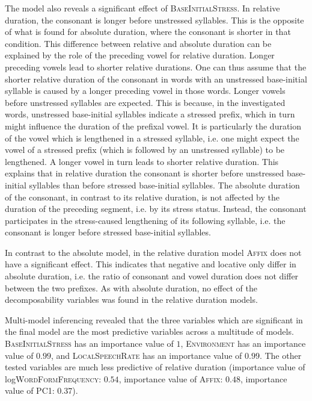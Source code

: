 The model also reveals a significant effect of \textsc{BaseInitialStress}. In relative duration, the consonant is longer before unstressed syllables. This is the opposite of what is found for absolute duration, where the consonant is shorter in that condition. 
This difference between relative and absolute duration can be explained by the role of the preceding vowel for relative duration. Longer preceding vowels lead to shorter relative durations. One can thus assume that the shorter relative duration of the consonant in words with an unstressed base-initial syllable is caused by a longer preceding vowel in those words.
Longer vowels before unstressed syllables are expected. This is because, in the investigated words, unstressed base-initial syllables indicate a stressed prefix, which in turn might influence the duration of the prefixal vowel. It is particularly the duration of the vowel which is lengthened in a stressed syllable, i.e. one might expect the vowel of a stressed prefix (which is followed by an unstressed syllable) to be lengthened. A longer vowel in turn leads to shorter relative duration. This explains that in relative duration the consonant is shorter before unstressed base-initial syllables than before stressed base-initial syllables.
The absolute duration of the consonant, in contrast to its relative duration, is not affected by the duration of the preceding segment, i.e. by its stress status. Instead, the consonant participates in the stress-caused lengthening of its following syllable, i.e. the consonant is longer before stressed base-initial syllables. %

In contrast to the absolute model, in the relative duration model \textsc{Affix} does not have a significant effect. This indicates that negative and locative  only differ in absolute duration, i.e. the ratio of consonant and vowel duration does not differ between the two prefixes. 
As with absolute duration, no effect of the decomposability variables was found in the relative duration models. 

Multi-model inferencing revealed that the three variables which are significant in the final model are the most predictive variables across a multitude of models. \textsc{BaseInitialStress} has an importance value of $1$, \textsc{Environment}  has an importance value of $0.99$,  and  \textsc{LocalSpeechRate} has an importance value of $0.99$. The other tested variables are much less predictive of relative duration (importance value of log\textsc{WordFormFrequency}: $0.54$, importance value of \textsc{Affix}: $0.48$, importance value of \textsc{PC1}: $0.37$). 


